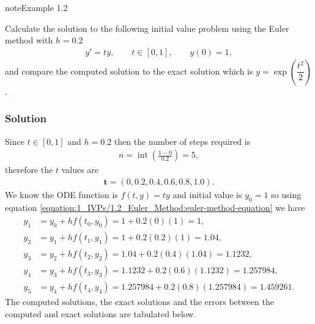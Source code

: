 \documentclass[letterpaper,10pt,english]{jupyterBook}
\begin{document}
\begin{sphinxadmonition}{note}{Example 1.2}

\sphinxAtStartPar
Calculate the solution to the following initial value problem using the Euler method with \(h = 0.2\)
\begin{equation*}
\begin{split}y' = ty, \qquad t\in [0,1], \qquad y(0)=1,\end{split}
\end{equation*}
\sphinxAtStartPar
and compare the computed solution to the exact solution which is \(y = \exp\left(\dfrac{t^2}{2}\right)\).
\subsubsection*{Solution}

\sphinxAtStartPar
Since \(t\in[0,1]\) and \(h=0.2\) then the number of steps required is
\begin{equation*}
\begin{split}n = \operatorname{int}\left(\frac{1 - 0}{0.2}\right) = 5, \end{split}
\end{equation*}
\sphinxAtStartPar
therefore the \(t\) values are
\begin{equation*}
\begin{split}\mathbf{t} = (0, 0.2, 0.4, 0.6, 0.8, 1.0).\end{split}
\end{equation*}
\sphinxAtStartPar
We know the ODE function is \(f(t, y) = ty\) and initial value is \(y_0 = 1\) so using equation \eqref{equation:1_IVPs/1.2_Euler_Method:euler-method-equation} we have
\begin{align*}
    y_1 &= y_0 + h f(t_0, y_0) = 1 + 0.2(0)(1) = 1,  \\
    y_2 &= y_1 + h f(t_1, y_1) = 1 + 0.2(0.2)(1) = 1.04, \\
    y_3 &= y_2 + h f(t_2, y_2) = 1.04 + 0.2(0.4)(1.04) = 1.1232, \\
    y_4 &= y_3 + h f(t_3, y_3) = 1.1232 + 0.2(0.6)(1.1232) = 1.257984, \\
    y_5 &= y_4 + h f(t_4, y_4) = 1.257984 + 0.2(0.8)(1.257984) = 1.459261.
\end{align*}
\sphinxAtStartPar
The computed solutions, the exact solutions and the errors between the computed and exact solutions are tabulated below.



\end{sphinxadmonition}
\end{document}
